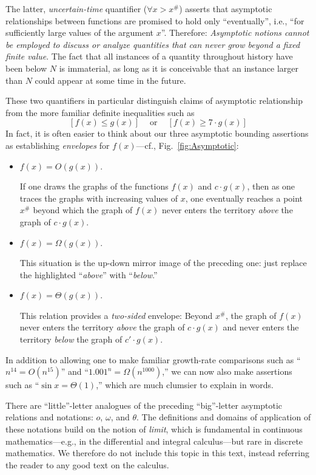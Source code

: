\smallskip

The latter, {\em uncertain-time} quantifier ($\forall x > x^{\#}$) asserts that asymptotic relationships between functions are promised to hold only ``eventually'', i.e., ``for sufficiently large values of the argument $x$''.  Therefore:  {\em Asymptotic notions cannot be employed to discuss or analyze quantities that can never grow beyond a fixed finite value}.  The fact that all instances of a quantity throughout history have been below $N$ is immaterial, as long as it is conceivable that an instance larger than $N$ could appear at some time in the future.

\smallskip

These two quantifiers in particular distinguish claims of asymptotic relationship from the more familiar definite inequalities such as
\[ [f(x) \leq g(x)] \ \ \ \ \mbox{ or } \ \ \ \ [f(x) \geq 7 \cdot g(x)] \]
In fact, it is often easier to think about our three asymptotic bounding assertions as establishing {\em envelopes} for $f(x)$---cf., Fig.~\ref{fig:Asymptotic}:
\begin{itemize}
\item
$f(x) = O(g(x))$.

If one draws the graphs of the functions $f(x)$ and $c \cdot g(x)$, then as one traces the graphs with increasing values of $x$, one eventually reaches a point $x^{\#}$ beyond which the graph of $f(x)$ never enters the territory {\em above} the graph of $c \cdot g(x)$.
\item
$f(x) = \Omega(g(x))$.

This situation is the up-down mirror image of the preceding one: just replace the highlighted ``{\em above}'' with ``{\em below}.''
\item
$f(x) = \Theta(g(x))$.

This relation provides a {\em two-sided} envelope:  Beyond $x^{\#}$, the graph of $f(x)$ never enters the territory {\em above} the graph of $c \cdot g(x)$ and never enters the territory
{\em below} the graph of $c' \cdot g(x)$.
\end{itemize}
In addition to allowing one to make familiar growth-rate comparisons such as ``$n^{14} = O(n^{15})$'' and ``$1.001^n = \Omega(n^{1000})$,'' we can now also make assertions such as ``$\sin x = \Theta(1)$,'' which are much clumsier to explain in words.

\medskip

There are ``little''-letter analogues of the preceding ``big''-letter asymptotic relations and notations: $o$, $\omega$, and $\theta$.  The definitions and domains of application of these notations build on the notion of {\it limit}, which is fundamental in continuous mathematics---e.g., in the differential and integral calculus---but rare in discrete mathematics.  We therefore do not include this topic in this text, instead referring the reader to any good text on the calculus.

